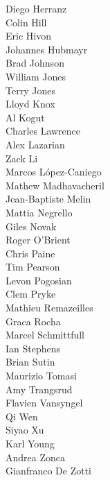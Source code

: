 \documentclass[PICOReport.tex]{subfiles}
\begin{document}
{\begin{multicols}{4}
Diego Herranz                   \\	
Colin Hill                      \\	
Eric Hivon                      \\	
Johannes Hubmayr                \\	
Brad Johnson                    \\	
William Jones                   \\	
Terry Jones                     \\	
Lloyd Knox                      \\	
Al Kogut                        \\	
Charles Lawrence                \\	
Alex Lazarian                   \\	
Zack Li                         \\	
Marcos L\'{o}pez-Caniego        \\	
Mathew Madhavacheril            \\	
Jean-Baptiste Melin             \\	
Mattia Negrello                 \\	
Giles Novak                     \\	
Roger O'Brient                  \\	
Chris Paine                     \\	
Tim Pearson                     \\	
Levon Pogosian                  \\	
Clem Pryke                      \\	
Mathieu Remazeilles             \\	
Graca Rocha                     \\	
Marcel Schmittfull              \\	
Ian Stephens                    \\	
Brian Sutin                     \\	
Maurizio Tomasi                 \\	
Amy Trangsrud                   \\	
Flavien Vansyngel               \\	
Qi Wen                          \\	
Siyao Xu                        \\	
Karl Young                      \\	
Andrea Zonca                    \\	
Gianfranco De Zotti            	
\end{multicols}
}
\end{document}
